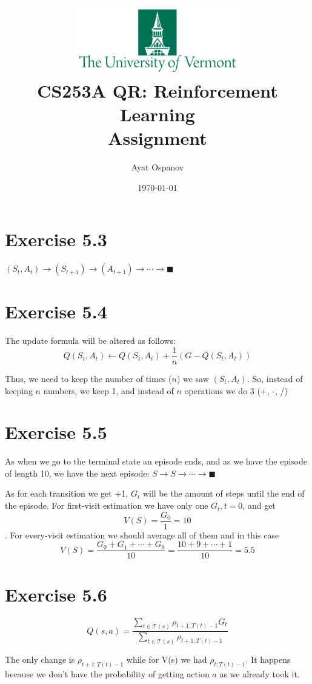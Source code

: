 \documentclass[12pt]{article}
\title{\Large\includegraphics[height=3cm]{pics/UVM.png} \\
    CS253A QR: Reinforcement Learning\\
    Assignment \textnumero 6}
\author{Ayat Ospanov}
\date{\today}
\begin{document}
    \maketitle
    \tableofcontents

    \section{Exercise 5.3}
        $(S_t, A_t) \rightarrow (S_{t+1}) \rightarrow (A_{t+1})
        \rightarrow \cdots \rightarrow \blacksquare$

    \section{Exercise 5.4}\label{sec:ex54}
        The update formula will be altered as follows:
        $$Q(S_t, A_t) \leftarrow Q(S_t, A_t) + \frac{1}{n}(G - Q(S_t, A_t))$$

        Thus, we need to keep the number of times ($n$) we saw $(S_t, A_t)$. So,
        instead of keeping $n$ numbers, we keep 1, and instead of $n$ operations
        we do 3 (+, -, /)

    \section{Exercise 5.5}
        As when we go to the terminal state an episode ends, and as we have the
        episode of length 10, we have the next episode:
        $S \rightarrow S \rightarrow \cdots \rightarrow \blacksquare$

        As for each transition we get +1, $G_t$ will be the amount of steps
        until the end of the episode. For first-visit estimation we have only one
        $G_t, t = 0$, and get $$V(S) = \frac{G_0}{1} = 10$$. For every-visit
        estimation we should average all of them and in this case $$V(S) =
        \frac{G_0 + G_1 + \cdots + G_{9}}{10} = \frac{10 + 9 + \cdots + 1}{10} = 5.5$$

    \section{Exercise 5.6}
        $$Q(s,a) = \frac{\sum_{t \in \mathcal{T}(s)} \rho_{t+1:T(t)-1} G_t}{\sum_{t \in \mathcal{T}(s)} \rho_{t+1:T(t)-1}}$$

        The only change is $\rho_{t+1:T(t)-1}$ while for V(s) we had $\rho_{t:T(t)-1}$.
        It happens because we don't have the probability of getting action $a$
        as we already took it.
\end{document}
